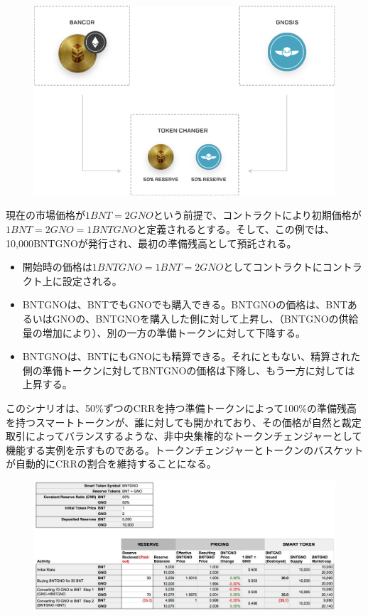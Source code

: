 \documentclass{jsarticle}
\begin{document}
  \begin{figure}
    \begin{center}
     \includegraphics[keepaspectratio,scale=0.8]{fig3.png}
    \end{center}
   \end{figure} 
  \noindent

  現在の市場価格が$1 BNT = 2 GNO$という前提で、コントラクトにより初期価格が$1 BNT = 2 GNO = 1 BNTGNO$と定義されるとする。そして、この例では、10,000BNTGNOが発行され、最初の準備残高として預託される。

  \begin{itemize}
    \item 開始時の価格は$1 BNTGNO = 1 BNT = 2 GNO$としてコントラクトにコントラクト上に設定される。
    \item BNTGNOは、BNTでもGNOでも購入できる。BNTGNOの価格は、BNTあるいはGNOの、BNTGNOを購入した側に対して上昇し、（BNTGNOの供給量の増加により）、別の一方の準備トークンに対して下降する。
    \item BNTGNOは、BNTにもGNOにも精算できる。それにともない、精算された側の準備トークンに対してBNTGNOの価格は下降し、もう一方に対しては上昇する。
  \end{itemize}

  このシナリオは、50\%ずつのCRRを持つ準備トークンによって100\%の準備残高を持つスマートトークンが、誰に対しても開かれており、その価格が自然と裁定取引によってバランスするような、非中央集権的なトークンチェンジャーとして機能する実例を示すものである。トークンチェンジャーとトークンのバスケットが自動的にCRRの割合を維持することになる。

  \begin{figure}[h]
   \begin{center}
    \includegraphics[scale=0.3]{fig4.png}
   \end{center}
  \end{figure}
\end{document}
